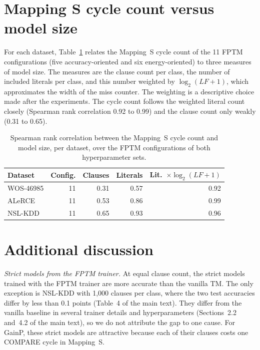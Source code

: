 \documentclass[preprint,12pt]{elsarticle}
\newcommand{\gainp}{GainP}
\newcommand{\LF}{\mathit{LF}}
\begin{document}
\section{Mapping S cycle count versus model size}\label{spearman}
For each dataset, Table~\ref{tab:spearman} relates the Mapping~S cycle count of the 11 FPTM configurations (five accuracy-oriented and six energy-oriented) to three measures of model size.
The measures are the clause count per class, the number of included literals per class, and this number weighted by $\log_2(\LF+1)$, which approximates the width of the miss counter.
The weighting is a descriptive choice made after the experiments.
The cycle count follows the weighted literal count closely (Spearman rank correlation 0.92 to 0.99) and the clause count only weakly (0.31 to 0.65).

\begin{table}[H]
\centering
\caption{Spearman rank correlation between the Mapping~S cycle count and model size, per dataset, over the FPTM configurations of both hyperparameter sets.}
\label{tab:spearman}
\begin{tabular}{lrrrr}
\toprule
Dataset & Config. & Clauses & Literals & Lit.\ $\times\log_2(\LF+1)$ \\
\midrule
WOS-46985 & 11 & 0.31 & 0.57 & 0.92 \\
ALeRCE & 11 & 0.53 & 0.86 & 0.99 \\
NSL-KDD & 11 & 0.65 & 0.93 & 0.96 \\
\bottomrule
\end{tabular}
\end{table}

\section{Additional discussion}\label{discussion}
\textit{Strict models from the FPTM trainer.} At equal clause count, the strict models trained with the FPTM trainer are more accurate than the vanilla TM.
The only exception is NSL-KDD with 1,000 clauses per class, where the two test accuracies differ by less than 0.1 points (Table~4 of the main text).
They differ from the vanilla baseline in several trainer details and hyperparameters (Sections~2.2 and~4.2 of the main text), so we do not attribute the gap to one cause.
For \gainp{}, these strict models are attractive because each of their clauses costs one COMPARE {cycle} in Mapping~S.
\end{document}
